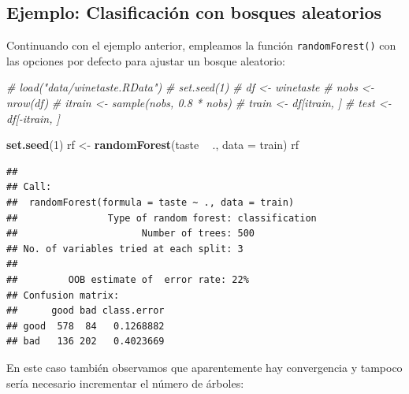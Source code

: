 \documentclass[
]{book}
\newenvironment{Shaded}{\begin{snugshade}}{\end{snugshade}}
\newcommand{\CommentTok}[1]{\textcolor[rgb]{0.56,0.35,0.01}{\textit{#1}}}
\newcommand{\DataTypeTok}[1]{\textcolor[rgb]{0.13,0.29,0.53}{#1}}
\newcommand{\DecValTok}[1]{\textcolor[rgb]{0.00,0.00,0.81}{#1}}
\newcommand{\KeywordTok}[1]{\textcolor[rgb]{0.13,0.29,0.53}{\textbf{#1}}}
\newcommand{\NormalTok}[1]{#1}
\newcommand{\OperatorTok}[1]{\textcolor[rgb]{0.81,0.36,0.00}{\textbf{#1}}}
\newcommand{\StringTok}[1]{\textcolor[rgb]{0.31,0.60,0.02}{#1}}
\theoremstyle{break}
\theoremstyle{definition}
\theoremstyle{definition}
\theoremstyle{definition}
\theoremstyle{remark}
\begin{document}
\hypertarget{ejemplo-clasificaciuxf3n-con-bosques-aleatorios}{%
\subsection{Ejemplo: Clasificación con bosques aleatorios}\label{ejemplo-clasificaciuxf3n-con-bosques-aleatorios}}

Continuando con el ejemplo anterior, empleamos la función \texttt{randomForest()} con las opciones por defecto para ajustar un bosque aleatorio:

\begin{Shaded}
\begin{Highlighting}[]
\CommentTok{# load("data/winetaste.RData")}
\CommentTok{# set.seed(1)}
\CommentTok{# df <- winetaste}
\CommentTok{# nobs <- nrow(df)}
\CommentTok{# itrain <- sample(nobs, 0.8 * nobs)}
\CommentTok{# train <- df[itrain, ]}
\CommentTok{# test <- df[-itrain, ]}

\KeywordTok{set.seed}\NormalTok{(}\DecValTok{1}\NormalTok{)}
\NormalTok{rf <-}\StringTok{ }\KeywordTok{randomForest}\NormalTok{(taste }\OperatorTok{~}\StringTok{ }\NormalTok{., }\DataTypeTok{data =}\NormalTok{ train)}
\NormalTok{rf}
\end{Highlighting}
\end{Shaded}

\begin{verbatim}
## 
## Call:
##  randomForest(formula = taste ~ ., data = train) 
##                Type of random forest: classification
##                      Number of trees: 500
## No. of variables tried at each split: 3
## 
##         OOB estimate of  error rate: 22%
## Confusion matrix:
##      good bad class.error
## good  578  84   0.1268882
## bad   136 202   0.4023669
\end{verbatim}

En este caso también observamos que aparentemente hay convergencia y tampoco sería necesario incrementar el número de árboles:

\begin{Shaded}
\end{Shaded}
\end{document}
